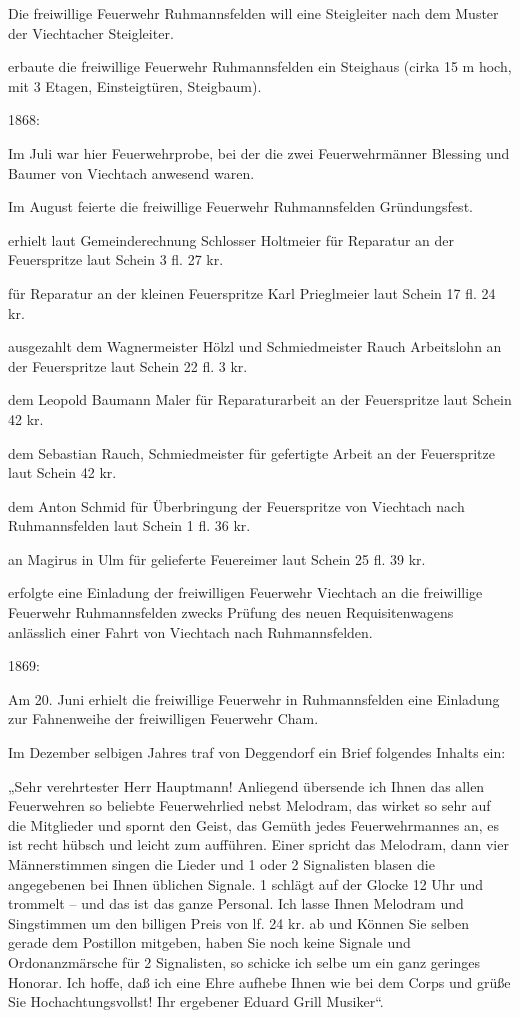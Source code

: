\documentclass[12pt,a4paper]{book}
\begin{document}
Die freiwillige Feuerwehr Ruhmannsfelden will eine Steigleiter nach dem Muster
der Viechtacher Steigleiter.

erbaute die freiwillige Feuerwehr Ruhmannsfelden ein Steighaus (cirka 15 m hoch,
mit 3 Etagen, Einsteigtüren, Steigbaum).

1868:

Im Juli war hier Feuerwehrprobe, bei der die zwei Feuerwehrmänner Blessing und
Baumer von Viechtach anwesend waren.

Im August feierte die freiwillige Feuerwehr Ruhmannsfelden Gründungsfest.

erhielt laut Gemeinderechnung Schlosser Holtmeier für Reparatur an der
Feuerspritze laut Schein 3 fl. 27 kr.

für Reparatur an der kleinen Feuerspritze Karl Prieglmeier laut Schein 17 fl. 24
kr.

ausgezahlt dem Wagnermeister Hölzl und Schmiedmeister Rauch Arbeitslohn an der
Feuerspritze laut Schein 22 fl. 3 kr.

dem Leopold Baumann Maler für Reparaturarbeit an der Feuerspritze laut Schein 42
kr.

dem Sebastian Rauch, Schmiedmeister für gefertigte Arbeit an der Feuerspritze
laut Schein 42 kr.

dem Anton Schmid für Überbringung der Feuerspritze von Viechtach nach
Ruhmannsfelden laut Schein 1 fl. 36 kr.

an Magirus in Ulm für gelieferte Feuereimer laut Schein 25 fl. 39 kr.

erfolgte eine Einladung der freiwilligen Feuerwehr Viechtach an die freiwillige
Feuerwehr Ruhmannsfelden zwecks Prüfung des neuen Requisitenwagens anlässlich
einer Fahrt von Viechtach nach Ruhmannsfelden.

1869:

Am 20. Juni erhielt die freiwillige Feuerwehr in Ruhmannsfelden eine Einladung
zur Fahnenweihe der freiwilligen Feuerwehr Cham.

Im Dezember selbigen Jahres traf von Deggendorf ein Brief folgendes Inhalts ein:

„Sehr verehrtester Herr Hauptmann! Anliegend übersende ich Ihnen das allen
Feuerwehren so beliebte Feuerwehrlied nebst Melodram, das wirket so sehr auf die
Mitglieder und spornt den Geist, das Gemüth jedes Feuerwehrmannes an, es ist
recht hübsch und leicht zum aufführen. Einer spricht das Melodram, dann vier
Männerstimmen singen die Lieder und 1 oder 2 Signalisten blasen die angegebenen
bei Ihnen üblichen Signale. 1 schlägt auf der Glocke 12 Uhr und trommelt – und
das ist das ganze Personal. Ich lasse Ihnen Melodram und Singstimmen um den
billigen Preis von lf. 24 kr. ab und Können Sie selben gerade dem Postillon
mitgeben, haben Sie noch keine Signale und Ordonanzmärsche für 2 Signalisten, so
schicke ich selbe um ein ganz geringes Honorar. Ich hoffe, daß ich eine Ehre
aufhebe Ihnen wie bei dem Corps und grüße Sie Hochachtungsvollst! Ihr ergebener
Eduard Grill Musiker“.
\end{document}

